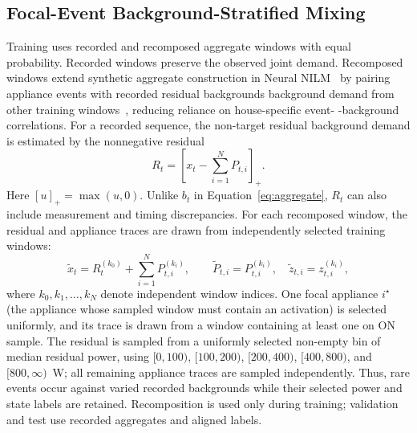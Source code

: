\documentclass[journal]{IEEEtran}
\providecommand{\DIFadd}[1]{{\protect\color{blue} \sf #1}} %
\providecommand{\DIFdel}[1]{{\protect\color{red} \scriptsize #1}} %
\providecommand{\DIFaddbegin}{} %
\providecommand{\DIFaddend}{} %
\providecommand{\DIFdelbegin}{} %
\providecommand{\DIFdelend}{} %
\providecommand{\DIFscaledelfig}{0.5}
\newlength{\DIFdelgraphicswidth} %
\newlength{\DIFdelgraphicsheight} %
\providecommand{\DIFaddincludegraphics}[2][]{{\color{blue}\fbox{\DIFOincludegraphics[#1]{#2}}}} %
\providecommand{\DIFdelincludegraphics}[2][]{%
\sbox{\DIFdelgraphicsbox}{\DIFOincludegraphics[#1]{#2}}%
\settoboxwidth{\DIFdelgraphicswidth}{\DIFdelgraphicsbox} %
\settoboxtotalheight{\DIFdelgraphicsheight}{\DIFdelgraphicsbox} %
\scalebox{\DIFscaledelfig}{%
\parbox[b]{\DIFdelgraphicswidth}{\usebox{\DIFdelgraphicsbox}\\[-\baselineskip] \rule{\DIFdelgraphicswidth}{0em}}\llap{\resizebox{\DIFdelgraphicswidth}{\DIFdelgraphicsheight}{%
\setlength{\unitlength}{\DIFdelgraphicswidth}%
\begin{picture}(1,1)%
\thicklines\linethickness{2pt} %
{\color[rgb]{1,0,0}\put(0,0){\framebox(1,1){}}}%
{\color[rgb]{1,0,0}\put(0,0){\line( 1,1){1}}}%
{\color[rgb]{1,0,0}\put(0,1){\line(1,-1){1}}}%
\end{picture}%
}\hspace*{3pt}}} %
} %
\DeclareRobustCommand{\DIFaddbegin}{\DIFOaddbegin \let\includegraphics\DIFaddincludegraphics} %
\DeclareRobustCommand{\DIFaddend}{\DIFOaddend \let\includegraphics\DIFOincludegraphics} %
\DeclareRobustCommand{\DIFdelbegin}{\DIFOdelbegin \let\includegraphics\DIFdelincludegraphics} %
\DeclareRobustCommand{\DIFdelend}{\DIFOaddend \let\includegraphics\DIFOincludegraphics} %
\begin{document}
\subsection{Focal-Event Background-Stratified Mixing}
\label{sec:training-strategy}

Training uses recorded and recomposed aggregate windows with equal probability. Recorded windows preserve the observed joint demand. Recomposed windows extend synthetic aggregate construction in Neural NILM~\cite{kelly2015neural} by pairing appliance events with recorded \DIFdelbegin \DIFdel{residual backgrounds }\DIFdelend \DIFaddbegin \DIFadd{background demand }\DIFaddend from other training windows~\cite{liu2026recomposition}, reducing reliance on house-specific event-\DIFdelbegin \DIFdel{-}\DIFdelend background correlations. For a recorded sequence, the \DIFdelbegin \DIFdel{non-target residual }\DIFdelend \DIFaddbegin \DIFadd{background demand }\DIFaddend is \DIFaddbegin \DIFadd{estimated by the nonnegative residual
}\DIFaddend \begin{equation}
R_t=\left[x_t-\sum_{i=1}^{N}P_{t,i}\right]_+.
\label{eq:training-residual}
\end{equation}
\DIFaddbegin \DIFadd{Here $[u]_+=\max(u,0)$. Unlike $b_t$ in Equation~\eqref{eq:aggregate}, $R_t$ can also include measurement and timing discrepancies. }\DIFaddend For each recomposed window, the residual and appliance traces are drawn from independently selected training windows:
\begin{equation}
\tilde{x}_t=R_t^{(k_0)}+\sum_{i=1}^{N}P_{t,i}^{(k_i)},
\qquad
\tilde{P}_{t,i}=P_{t,i}^{(k_i)},\quad
\tilde{z}_{t,i}=z_{t,i}^{(k_i)},
\label{eq:training-recomposition}
\end{equation}
where $k_0,k_1,\ldots,k_N$ denote independent window indices. One focal appliance $i^\star$ \DIFaddbegin \DIFadd{(the appliance whose sampled window must contain an activation) }\DIFaddend is selected uniformly, and its trace is drawn from a window containing at least one \DIFdelbegin \DIFdel{on }\DIFdelend \DIFaddbegin \DIFadd{ON }\DIFaddend sample. The residual is sampled from a uniformly selected non-empty bin of median residual power, using $[0,100)$, $[100,200)$, $[200,400)$, $[400,800)$, and $[800,\infty)$~W; all remaining appliance traces are sampled independently. Thus, rare events occur against varied recorded backgrounds while their selected power and state labels are retained. Recomposition is used only during training; validation and test use recorded aggregates and aligned labels.
\end{document}
